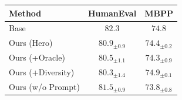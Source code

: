 \begin{tabular}{lcc}
\toprule
Method & HumanEval & MBPP \\
\midrule
Base & $82.3$ & $74.8$ \\
Ours (Hero) & $80.9_{\pm 0.9}$ & $74.4_{\pm 0.2}$ \\
Ours (+Oracle) & $80.5_{\pm 1.1}$ & $74.3_{\pm 0.9}$ \\
Ours (+Diversity) & $80.3_{\pm 1.4}$ & $74.9_{\pm 0.1}$ \\
Ours (w/o Prompt) & $81.5_{\pm 0.9}$ & $73.8_{\pm 0.8}$ \\
\bottomrule
\end{tabular}
